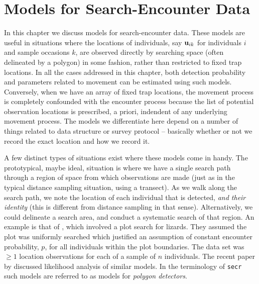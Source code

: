 \chapter{Models for  Search-Encounter Data}
\label{chapt.search-encounter}

\vspace{0.3cm}


In this chapter we discuss models for search-encounter data. These
models are useful in situations where the locations of individuals,
say ${\bf u}_{ik}$ for individuals $i$ and sample occasions $k$, are
observed directly by searching space (often delineated by a polygon)
in some fashion, rather than restricted to fixed trap locations.  In
all the cases addressed in this chapter, both detection probability
and parameters related to movement can be estimated using such models.
Conversely, when we have an array of fixed trap locations, the
movement process is completely confounded with the encounter process
because the list of potential observation locations is prescribed, a
priori, indendent of any underlying movement process.  The models we
differentiate here depend on a number of things related to data
structure or survey protocol -- basically whether or not we record the
exact location and how we record it.

A few distinct types of situations exist where these models come in
handy. The prototypical, maybe ideal, situation
\citet{royle_etal:2011mee} is where we have a single search path
through a region of space from which observations are made (just as in
the typical distance sampling situation, using a transect). As we walk
along the search path, we note the location of each individual that is
detected, {\it and their identity} (this is different from distance
sampling in that sense).  Alternatively, we could delineate a search
area, and conduct a systematic search of that region. An example is
that of \citet{royle_young:2008}, which involved a plot search for
lizards. They assumed the plot was uniformly searched which justified
an assumption of constant encounter probability, $p$, for all
individuals within the plot boundaries.  The data set was $\ge 1$
location observations for each of a sample of $n$ individuals.  The
recent paper by \citet{efford:2011} discussed likelihood analysis of
similar models. In the terminology of \mbox{\tt secr} such models are
referred to as models for {\it polygon detectors}.

